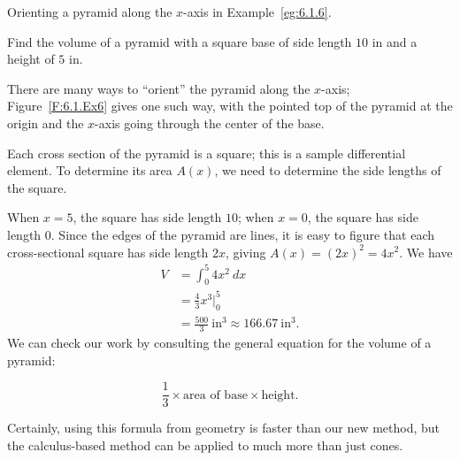 \begin{marginfigure}[6cm] %
\caption{Orienting a pyramid along the $x$-axis in Example~\ref{eg:6.1.6}.} \label{F:6.1.Ex6}
\end{marginfigure}

\begin{example} \label{eg:6.1.6} %
Find the volume of a pyramid with a square base of side length $10$ in and a height of $5$ in.

\solution There are many ways to ``orient'' the pyramid along the $x$-axis; Figure~\ref{F:6.1.Ex6} gives one such way, with the pointed top of the pyramid at the origin and the $x$-axis going through the center of the base.

Each cross section of the pyramid is a square; this is a sample differential element. To determine its area $A(x)$, we need to determine the side lengths of the square.

When $x=5$, the square has side length $10$; when $x=0$, the square has side length $0$. Since the edges of the pyramid are lines, it is easy to figure that each cross-sectional square has side length $2x$, giving $A(x) = (2x)^2=4x^2$. We have 
\begin{align*} 
V &= \int_0^5 4x^2\ dx\\
&= \frac43x^3\Big|_0^5 \\
&=\frac{500}{3}\ \text{in}^3 \approx 166.67\ \text{in}^3.
\end{align*}
We can check our work by consulting the general equation for the volume of a pyramid: %

$$\frac13 \times \text{area of base}\times \text{height.}$$

Certainly, using this formula from geometry is faster than our new method, but the calculus-based method can be applied to much more than just cones.
\end{example}



